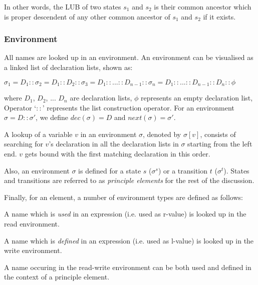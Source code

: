 \documentclass[12pt,a4paper]{report}
\begin{document}
In other words, the LUB of two states $s_1$ and $s_2$ is their common ancestor which is proper descendent of any other common ancestor of $s_1$ and $s_2$ if it exists.

\subsubsection{Environment}
All names are looked up in an environment. An environment can be visualised as a linked list of declaration lists, shown as:

$\sigma_1 = D_1 :: \sigma_2 = D_1 :: D_2 :: \sigma_3 = D_1 :: ... :: D_{n-1} :: \sigma_n  = D_1 :: ... :: D_{n-1} :: D_n :: \phi $

where $D_1$, $D_2$, ... $D_n$ are declaration lists, $\phi$ represents an empty declaration list, Operator `$::$' represents the list construction operator. For an environment $\sigma = D :: \sigma'$, we define $dec(\sigma) = D$ and $next(\sigma) = \sigma'$.

A lookup of a variable $v$ in an environment $\sigma$, denoted by $\sigma[v]$, consists of searching for $v$'s declaration in all the declaration lists in $\sigma$ starting from the left end. $v$ gets bound with the first matching declaration in this order.

Also, an environment $\sigma$ is defined for a state $s$ ($\sigma^s$) or a transition $t$ ($\sigma^t$). States and transitions are referred to as \emph{principle elements} for the rest of the discussion.

Finally, for an element, a number of environment types are defined as follows:

\begin{definition}
	A name which is \emph{used} in an expression (i.e. used as r-value) is looked up in the read environment. 
\end{definition}

\begin{definition}
	A name which is \emph{defined} in an expression (i.e. used as l-value) is looked up in the write environment. 
\end{definition}

\begin{definition}
	A name occuring in the read-write environment can be both used and defined in the context of a principle element. 
\end{definition}
\end{document}
